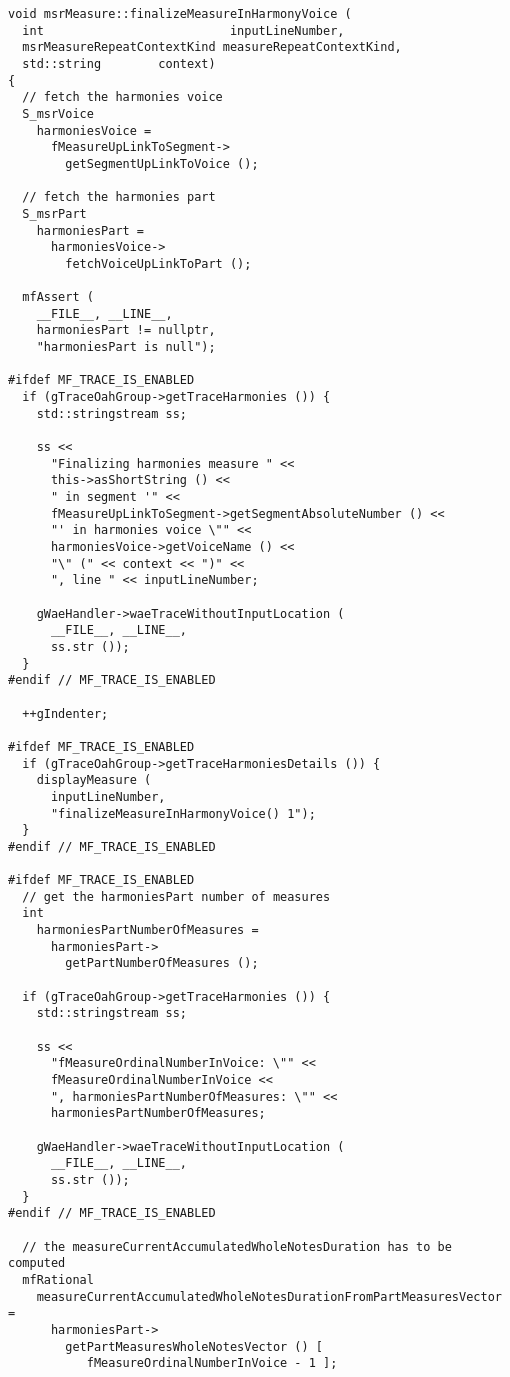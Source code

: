 \begin{lstlisting}[language=CPlusPlus]
void msrMeasure::finalizeMeasureInHarmonyVoice (
  int                          inputLineNumber,
  msrMeasureRepeatContextKind measureRepeatContextKind,
  std::string        context)
{
  // fetch the harmonies voice
  S_msrVoice
    harmoniesVoice =
      fMeasureUpLinkToSegment->
        getSegmentUpLinkToVoice ();

  // fetch the harmonies part
  S_msrPart
    harmoniesPart =
      harmoniesVoice->
        fetchVoiceUpLinkToPart ();

  mfAssert (
    __FILE__, __LINE__,
    harmoniesPart != nullptr,
    "harmoniesPart is null");

#ifdef MF_TRACE_IS_ENABLED
  if (gTraceOahGroup->getTraceHarmonies ()) {
    std::stringstream ss;

    ss <<
      "Finalizing harmonies measure " <<
      this->asShortString () <<
      " in segment '" <<
      fMeasureUpLinkToSegment->getSegmentAbsoluteNumber () <<
      "' in harmonies voice \"" <<
      harmoniesVoice->getVoiceName () <<
      "\" (" << context << ")" <<
      ", line " << inputLineNumber;

    gWaeHandler->waeTraceWithoutInputLocation (
      __FILE__, __LINE__,
      ss.str ());
  }
#endif // MF_TRACE_IS_ENABLED

  ++gIndenter;

#ifdef MF_TRACE_IS_ENABLED
  if (gTraceOahGroup->getTraceHarmoniesDetails ()) {
    displayMeasure (
      inputLineNumber,
      "finalizeMeasureInHarmonyVoice() 1");
  }
#endif // MF_TRACE_IS_ENABLED

#ifdef MF_TRACE_IS_ENABLED
  // get the harmoniesPart number of measures
  int
    harmoniesPartNumberOfMeasures =
      harmoniesPart->
        getPartNumberOfMeasures ();

  if (gTraceOahGroup->getTraceHarmonies ()) {
    std::stringstream ss;

    ss <<
      "fMeasureOrdinalNumberInVoice: \"" <<
      fMeasureOrdinalNumberInVoice <<
      ", harmoniesPartNumberOfMeasures: \"" <<
      harmoniesPartNumberOfMeasures;

    gWaeHandler->waeTraceWithoutInputLocation (
      __FILE__, __LINE__,
      ss.str ());
  }
#endif // MF_TRACE_IS_ENABLED

  // the measureCurrentAccumulatedWholeNotesDuration has to be computed
  mfRational
    measureCurrentAccumulatedWholeNotesDurationFromPartMeasuresVector =
      harmoniesPart->
        getPartMeasuresWholeNotesVector () [
           fMeasureOrdinalNumberInVoice - 1 ];


\end{lstlisting}

